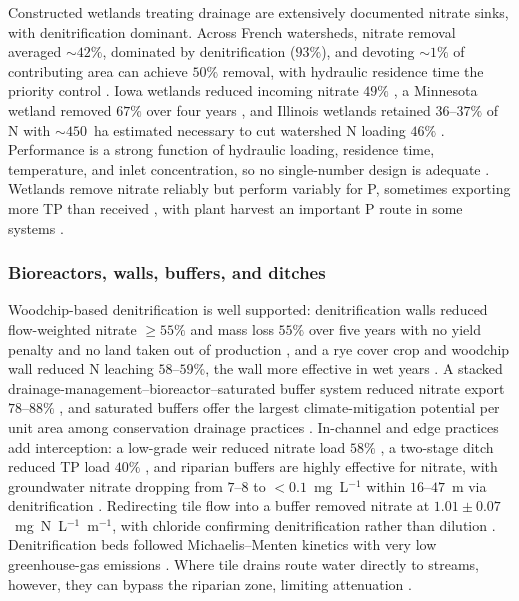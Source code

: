 \documentclass[11pt]{article}
\begin{document}
Constructed wetlands treating drainage are extensively documented nitrate
sinks, with denitrification dominant. Across French watersheds, nitrate
removal averaged $\sim42\%$, dominated by denitrification ($93\%$), and
devoting $\sim1\%$ of contributing area can achieve $50\%$ removal, with
hydraulic residence time the priority control \parencite{Tournebize2017}.
Iowa wetlands reduced incoming nitrate $49\%$ \parencite{Drake2018}, a
Minnesota wetland removed $67\%$ over four years \parencite{Gordon2021}, and
Illinois wetlands retained $36$--$37\%$ of N with $\sim450$~ha estimated
necessary to cut watershed N loading $46\%$ \parencite{Kovacic2006}.
Performance is a strong function of hydraulic loading, residence time,
temperature, and inlet concentration, so no single-number design is adequate
\parencite{Kadlec2012,Steidl2019}. Wetlands remove nitrate reliably but
perform variably for P, sometimes exporting more TP than received
\parencite{Tanner2005,Tanner2011,Messer2021}, with plant harvest an important
P route in some systems \parencite{Lenhart2016}.

\subsubsection{Bioreactors, walls, buffers, and ditches}

Woodchip-based denitrification is well supported: denitrification walls
reduced flow-weighted nitrate $\geq55\%$ and mass loss $55\%$ over five years
with no yield penalty and no land taken out of production
\parencite{Jaynes2008}, and a rye cover crop and woodchip wall reduced N
leaching $58$--$59\%$, the wall more effective in wet years
\parencite{Rogovska2023}. A stacked drainage-management--bioreactor--saturated
buffer system reduced nitrate export $78$--$88\%$ \parencite{Singh2024b}, and
saturated buffers offer the largest climate-mitigation potential per unit area
among conservation drainage practices \parencite{Hall2025}. In-channel and
edge practices add interception: a low-grade weir reduced nitrate load $58\%$
\parencite{Strock2025b}, a two-stage ditch reduced TP load $40\%$
\parencite{Hodaj2017}, and riparian buffers are highly effective for nitrate,
with groundwater nitrate dropping from $7$--$8$ to $<0.1$~mg~L$^{-1}$ within
$16$--$47$~m via denitrification \parencite{JACOBS1985,Schilling2022}.
Redirecting tile flow into a buffer removed nitrate at
$1.01\pm0.07$~mg~N~L$^{-1}$~m$^{-1}$, with chloride confirming denitrification
rather than dilution \parencite{Jaynes2014,Carstensen2021}. Denitrification
beds followed Michaelis--Menten kinetics with very low greenhouse-gas
emissions \parencite{Ghane2015}. Where tile drains route water directly to
streams, however, they can bypass the riparian zone, limiting attenuation
\parencite{Puckett2005}.
\end{document}
